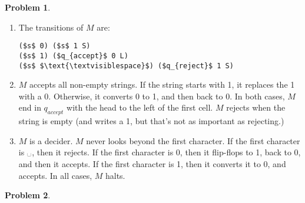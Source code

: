 \documentclass[11pt]{article}
\theoremstyle{definition}
\theoremstyle{case}
\theoremstyle{theorem}
\newtheorem{prob}{Problem}
\begin{document}
\begin{prob}\end{prob}

\begin{enumerate}[label=(\alph*)]

\item 

The transitions of $M$ are:

\begin{lstlisting}
($s$ 0) ($s$ 1 S) 
($s$ 1) ($q_{accept}$ 0 L)
($s$ $\text{\textvisiblespace}$) ($q_{reject}$ 1 S)
\end{lstlisting}

\item

$M$ accepts all non-empty strings. If the string starts with 1, it replaces the 1 with a 0.
Otherwise, it converts 0 to 1, and then back to 0. In both cases, $M$ end in $q_{accept}$ 
with the head to the left of the first cell. $M$ rejects when the string is empty (and writes 
a 1, but that's not as important as rejecting.)

\item

$M$ is a decider. $M$ never looks beyond the first character. If the first character is
$\text{\textvisiblespace}$, then it rejects. If the first character is 0, then it 
flip-flops to 1, back to 0, and then it accepts. If the first character is 1, then it
converts it to 0, and accepts. In all cases, $M$ halts.

\end{enumerate}

\newpage

\begin{prob}\end{prob}
\end{document}
